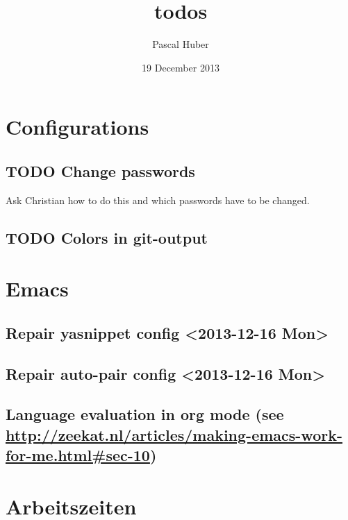 \documentclass[11pt]{article}
\title{todos}
\author{Pascal Huber}
\date{19 December 2013}
\begin{document}
\maketitle

\setcounter{tocdepth}{3}
\tableofcontents
\vspace*{1cm}
\section{Configurations}
\label{sec-1}


\subsection{\textbf{TODO} Change passwords}
\label{sec-1.1}

Ask Christian how to do this and which passwords have to be changed. 

\subsection{\textbf{TODO} Colors in git-output}
\label{sec-1.2}




\section{Emacs}
\label{sec-2}


\subsection{Repair yasnippet config <2013-12-16 Mon>}
\label{sec-2.1}


\subsection{Repair auto-pair config <2013-12-16 Mon>}
\label{sec-2.2}


\subsection{Language evaluation in org mode (see \href{http://zeekat.nl/articles/making-emacs-work-for-me.html#sec-10}{http://zeekat.nl/articles/making-emacs-work-for-me.html\#sec-10})}
\label{sec-2.3}




\section{Arbeitszeiten}
\label{sec-3}
\end{document}
